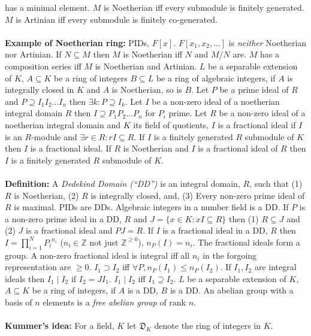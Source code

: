 has a minimal element.  
$M$ is Noetherian iff every submodule is finitely generated.
$M$ is Artinian iff every submodule is finitely co-generated.  
\\
\\
{\bf Example of Noetherian ring:}
PIDs, $F[x]$.  $F[x_1 ,x_2, \ldots ]$ is \emph{neither} Noetherian nor Artinian.
If $N \subseteq M$ then $M$ is Noetherian iff $N$ and $M/N$ are.  $M$ has a
composition series iff $M$ is Noetherian and Artinian.
$L$ be a separable extension of $K$, 
$A \subseteq K$ be a ring of integers
$B \subseteq L$ be a ring of algebraic integers, if $A$ is integrally closed
in $K$ and $A$ is Noetherian, so is $B$.
Let $P$ be a prime ideal of $R$ and 
$P \supseteq I_1 I_2 \ldots I_n$ then
$\exists k: P \supseteq I_k$.
Let $I$ be a non-zero ideal of a noetherian integral domain $R$ then
$I \supseteq P_1 P_2 \ldots P_n$ for $P_i$ prime.
Let $R$ be a non-zero ideal of a noetherian integral domain and $K$ its
field of quotients, $I$ is a fractional ideal if $I$ is an $R$-module and
$\exists r \in R: rI \subseteq R$.  If $I$ is a finitely generated $R$
submodule of $K$ then $I$ is a fractional ideal.  If $R$ is Noetherian and $I$
is a fractional ideal of $R$ then $I$ is a finitely generated $R$ submodule of $K$.
\\
\\
{\bf Definition:}
A \emph{Dedekind Domain (``DD'')} is an integral domain, $R$, such that 
(1) $R$ is Noetherian,
(2) $R$ is integrally closed, and, (3) Every non-zero prime ideal of $R$ is maximal.
PIDs are DDs.  Algebraic integers in a number field is a DD.  If $P$ is a non-zero
prime ideal in a DD, $R$ and $J=\{x \in K: xI \subseteq R \}$ then
(1) $R \subseteq J$ and (2) $J$ is a fractional ideal and $PJ=R$.  If $I$
is a fractional ideal in a DD, $R$ then $I= \prod_{i=1}^N {P_i}^{n_i}$ 
($n_i \in {\mathbb Z}$ not just ${\mathbb Z}^{\ge 0}$), $n_P(I)=n_i$.  The
fractional ideals form a group.  A non-zero fractional ideal is integral iff all
$n_i$ in the forgoing representation are $\ge 0$.  $I_1 \supset I_2$ iff
$\forall P, n_P(I_1) \le n_P(I_2)$.  If $I_1 , I_2$ are integral ideals then
$I_1 \mid I_2$ if $I_2= J I_1$.  $I_1 \mid I_2$ iff $I_1 \supseteq I_2$.
$L$ be a separable extension of $K$, 
$A \subseteq K$ be a ring of integers, if $A$ is a DD, $B$ is a DD.
An abelian group with a basis of $n$ elements is a \emph{free abelian
group} of rank $n$.
\\
\\
{\bf Kummer's idea:}  For a field, $K$ let
${\mathfrak D}_K$ denote the ring of integers in $K$.
